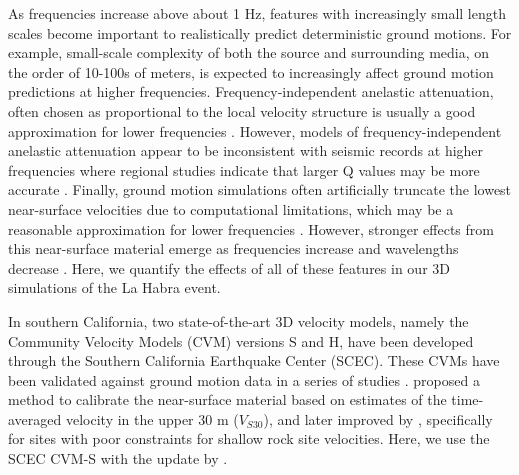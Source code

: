 As frequencies increase above about 1 Hz, features with increasingly small length scales become important to realistically predict deterministic ground motions. For example, small-scale complexity of both the source and surrounding media, on the order of 10-100s of meters, is expected to increasingly affect ground motion predictions at higher frequencies. Frequency-independent anelastic attenuation, often chosen as proportional to the local velocity structure  is usually a good approximation for lower frequencies \citep[up to \textasciitilde 1 Hz; e.g., ][]{liu1976velocity,fehler1992separation}. However, models of frequency-independent anelastic attenuation appear to be inconsistent with seismic records at higher frequencies where regional studies indicate that larger Q values may be more accurate . Finally, ground motion simulations often artificially truncate the lowest near-surface velocities due to computational limitations, which may be a reasonable approximation for lower frequencies . However, stronger effects from this near-surface material emerge as frequencies increase and wavelengths decrease . Here, we quantify the effects of all of these features in our 3D simulations of the La Habra event.

In southern California, two state-of-the-art 3D velocity models, namely the Community Velocity Models (CVM) versions S and H, have been developed through the Southern California Earthquake Center (SCEC). These CVMs have been validated against ground motion data in a series of studies .
\citet{elyVs30derivedNearsurfaceSeismic2010} proposed a method to calibrate the near-surface material based on estimates of the time-averaged velocity in the upper 30 m ($V_{S30}$), and later improved by \citet{huCalibrationNearsurfaceSeismic2021}, specifically for sites with poor constraints for shallow rock site velocities. Here, we use the SCEC CVM-S with the update by \citet{huCalibrationNearsurfaceSeismic2021}.

